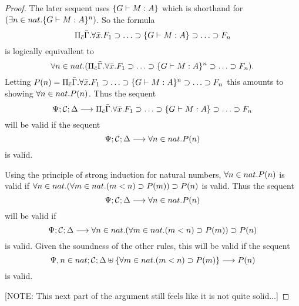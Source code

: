 \documentclass[11pt]{article}
\begin{document}
\begin{proof}
The later sequent uses $\{G \vdash M:A\}$ which is
shorthand for $(\exists n\in nat. \{G \vdash M:A\}^n)$.
%
So the formula 
%
\[
\Pi_{\bar{c}}\bar{\Gamma}.\forall \bar{x}. F_1\supset \ldots\supset \{G \vdash M:A\}\supset \ldots\supset F_n
\]
% 
is logically equivallent to 
%
\[
\forall n\in nat. (\Pi_{\bar{c}}\bar{\Gamma}.\forall \bar{x}. F_1\supset \ldots\supset \{G \vdash M:A\}^n\supset \ldots\supset F_n).
\] 
%
Letting 
$P(n)=\Pi_{\bar{c}}\bar{\Gamma}.\forall \bar{x}. F_1\supset \ldots\supset \{G \vdash M:A\}^n\supset \ldots\supset F_n$ 
this amounts to showing $\forall n\in nat. P(n)$.
%
Thus the sequent
%
\[
\Psi;\mathcal{C};\Delta\longrightarrow \Pi_{\bar{c}}\bar{\Gamma}.\forall \bar{x}. F_1\supset \ldots\supset \{G \vdash M:A\}\supset \ldots\supset F_n
\]
%
will be valid if the sequent
\[\Psi;\mathcal{C};\Delta\longrightarrow \forall n\in nat. P(n)\]
is valid.

Using the principle of strong induction for natural numbers,
$\forall n\in nat. P(n)$ is valid if 
$\forall n\in nat. (\forall m\in nat. (m<n)\supset P(m))\supset P(n)$ 
is valid.
%
Thus the sequent 
\[\Psi;\mathcal{C};\Delta\longrightarrow \forall n\in nat. P(n)\]
will be valid if
%
\[
\Psi;\mathcal{C};\Delta\longrightarrow \forall n\in nat. (\forall m\in nat. (m<n)\supset P(m))\supset P(n)
\]
%
is valid.
%
Given the soundness of the other rules, this will be valid if the
sequent
%
\[
\Psi,n\in nat;\mathcal{C};\Delta\uplus\{\forall m\in nat. (m<n)\supset P(m)\}\longrightarrow P(n)
\]
%
is valid.

[NOTE: This next part of the argument still feels like it is not quite
solid...]


\end{proof}
\end{document}
